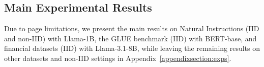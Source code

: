 \documentclass{article} %
\begin{document}

\subsection{Main Experimental Results}
Due to page limitations, we present the main results on Natural Instructions (IID and non-IID) with Llama-1B, the GLUE benchmark (IID) with BERT-base, and financial datasets (IID) with Llama-3.1-8B, while leaving the remaining results on other datasets and non-IID settings in Appendix~\ref{appendixsection:exps}. 
\end{document}
